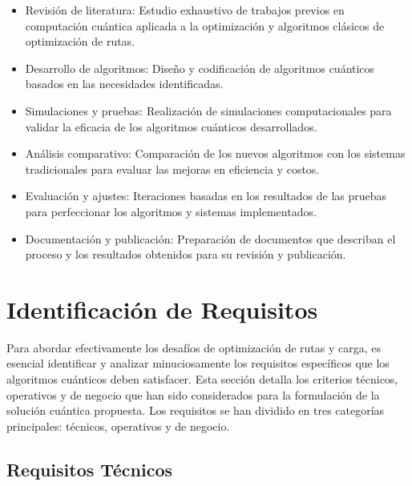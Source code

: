 \documentclass[11pt,a4paper,spanish]{book}
\begin{document}
\begin{itemize}

    \item Revisión de literatura: Estudio exhaustivo de trabajos previos en computación cuántica aplicada a la optimización y algoritmos clásicos de optimización de rutas.

    \item Desarrollo de algoritmos: Diseño y codificación de algoritmos cuánticos basados en las necesidades identificadas.

    \item Simulaciones y pruebas: Realización de simulaciones computacionales para validar la eficacia de los algoritmos cuánticos desarrollados.

    \item Análisis comparativo: Comparación de los nuevos algoritmos con los sistemas tradicionales para evaluar las mejoras en eficiencia y costos.

    \item Evaluación y ajustes: Iteraciones basadas en los resultados de las pruebas para perfeccionar los algoritmos y sistemas implementados.

    \item Documentación y publicación: Preparación de documentos que describan el proceso y los resultados obtenidos para su revisión y publicación.

\end{itemize}

\chapter{Identificación de Requisitos}

Para abordar efectivamente los desafíos de optimización de rutas y carga, es esencial identificar y analizar minuciosamente los requisitos específicos que los algoritmos cuánticos deben satisfacer. Esta sección detalla los criterios técnicos, operativos y de negocio que han sido considerados para la formulación de la solución cuántica propuesta. Los requisitos se han dividido en tres categorías principales: técnicos, operativos y de negocio.


\section{Requisitos Técnicos}
\end{document}
